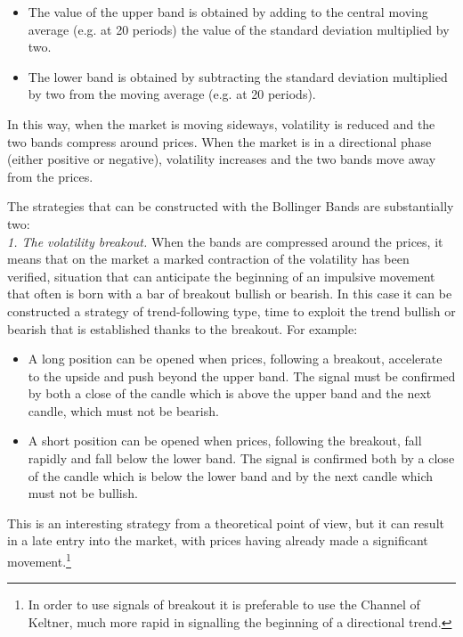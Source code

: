 \begin{itemize}
\setlength\itemsep{0.3em}
\item The value of the upper band is obtained by adding to the central moving average (e.g. at 20 periods) the value of the standard deviation multiplied by two. 
\item The lower band is obtained by subtracting the standard deviation multiplied by two from the moving average (e.g. at 20 periods). 
\end{itemize} 

In this way, when the market is moving sideways, volatility is reduced and the two bands compress around prices. When the market is in a directional phase (either positive or negative), volatility increases and the two bands move away from the prices.

The strategies that can be constructed with the Bollinger Bands are substantially two:\\

\noindent\textit{1. The volatility breakout.} When the bands are compressed around the prices, it means that on the market a marked contraction of the volatility has been verified, situation that can anticipate the beginning of an impulsive movement that often is born with a bar of breakout bullish or bearish. In this case it can be constructed a strategy of trend-following type, time to exploit the trend bullish or bearish that is established thanks to the breakout. For example:

\begin{itemize}
\setlength\itemsep{0.3em}
\item A long position can be opened when prices, following a breakout, accelerate to the upside and push beyond the upper band. The signal must be confirmed by both a close of the candle which is above the upper band and the next candle, which must not be bearish.
\item A short position can be opened when prices, following the breakout, fall rapidly and fall below the lower band. The signal is confirmed both by a close of the candle which is below the lower band and by the next candle which must not be bullish. 
\end{itemize} 

This is an interesting strategy from a theoretical point of view, but it can result in a late entry into the market, with prices having already made a significant movement.\footnote{In order to use signals of breakout it is preferable to use the Channel of Keltner, much more rapid in signalling the beginning of a directional trend.}  \\

